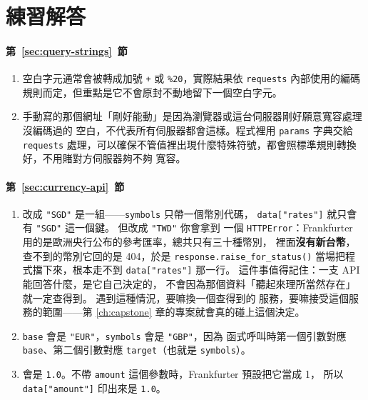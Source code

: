 \section*{練習解答}

\paragraph{第~\ref{sec:query-strings}~節}
\begin{enumerate}
\item 空白字元通常會被轉成加號 \texttt{+} 或 \texttt{\%20}，實際結果依 \texttt{requests}
內部使用的編碼規則而定，但重點是它不會原封不動地留下一個空白字元。
\item 手動寫的那個網址「剛好能動」是因為瀏覽器或這台伺服器剛好願意寬容處理沒編碼過的
空白，不代表所有伺服器都會這樣。程式裡用 \texttt{params} 字典交給 \texttt{requests}
處理，可以確保不管值裡出現什麼特殊符號，都會照標準規則轉換好，不用賭對方伺服器夠不夠
寬容。
\end{enumerate}

\paragraph{第~\ref{sec:currency-api}~節}
\begin{enumerate}
\item 改成 \texttt{"SGD"} 是一組——\texttt{symbols} 只帶一個幣別代碼，
\texttt{data["rates"]} 就只會有 \texttt{"SGD"} 這一個鍵。 但改成 \texttt{"TWD"} 你會拿到
一個 \texttt{HTTPError}：Frankfurter 用的是歐洲央行公布的參考匯率，總共只有三十種幣別，
裡面\textbf{沒有新台幣}，查不到的幣別它回的是 404，於是
\texttt{response.raise\_for\_status()} 當場把程式擋下來，根本走不到
\texttt{data["rates"]} 那一行。 這件事值得記住：一支 API 能回答什麼，是它自己決定的，
不會因為那個資料「聽起來理所當然存在」就一定查得到。 遇到這種情況，要嘛換一個查得到的
服務，要嘛接受這個服務的範圍——第 \ref{ch:capstone} 章的專案就會真的碰上這個決定。
\item \texttt{base} 會是 \texttt{"EUR"}，\texttt{symbols} 會是 \texttt{"GBP"}，因為
函式呼叫時第一個引數對應 \texttt{base}、第二個引數對應 \texttt{target}（也就是
\texttt{symbols}）。
\item 會是 \texttt{1.0}。不帶 \texttt{amount} 這個參數時，Frankfurter 預設把它當成 1，
所以 \texttt{data["amount"]} 印出來是 \texttt{1.0}。
\end{enumerate}

